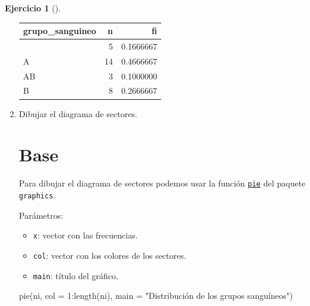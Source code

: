 \documentclass[
  spanish,
  a4paper,
]{scrreport}
\newenvironment{Shaded}{\begin{snugshade}}{\end{snugshade}}
\newcommand{\AttributeTok}[1]{\textcolor[rgb]{0.40,0.45,0.13}{#1}}
\newcommand{\DecValTok}[1]{\textcolor[rgb]{0.68,0.00,0.00}{#1}}
\newcommand{\FunctionTok}[1]{\textcolor[rgb]{0.28,0.35,0.67}{#1}}
\newcommand{\NormalTok}[1]{\textcolor[rgb]{0.00,0.23,0.31}{#1}}
\newcommand{\SpecialCharTok}[1]{\textcolor[rgb]{0.37,0.37,0.37}{#1}}
\newcommand{\StringTok}[1]{\textcolor[rgb]{0.13,0.47,0.30}{#1}}
\providecommand{\tightlist}{%
  \setlength{\itemsep}{0pt}\setlength{\parskip}{0pt}}
\theoremstyle{definition}
\newtheorem{exercise}{Ejercicio}[chapter]
\theoremstyle{remark}
\begin{document}
\begin{exercise}[]
\begin{enumerate}
\begin{tcolorbox}
  \begin{longtable}[]{@{}lrr@{}}
  \toprule\noalign{}
  grupo\_sanguineo & n & fi \\
  \midrule\noalign{}
  \endhead
  \bottomrule\noalign{}
  \endlastfoot
  0 & 5 & 0.1666667 \\
  A & 14 & 0.4666667 \\
  AB & 3 & 0.1000000 \\
  B & 8 & 0.2666667 \\
  \end{longtable}

  \end{tcolorbox}
\item
  Dibujar el diagrama de sectores.

  \begin{tcolorbox}[enhanced jigsaw, titlerule=0mm, arc=.35mm, rightrule=.15mm, opacitybacktitle=0.6, leftrule=.75mm, colframe=quarto-callout-tip-color-frame, toptitle=1mm, breakable, colbacktitle=quarto-callout-tip-color!10!white, bottomrule=.15mm, colback=white, left=2mm, bottomtitle=1mm, opacityback=0, title=\textcolor{quarto-callout-tip-color}{\faLightbulb}\hspace{0.5em}{Solución}, toprule=.15mm, coltitle=black]

  \section{Base}

  Para dibujar el diagrama de sectores podemos usar la función
  \href{https://www.rdocumentation.org/packages/graphics/versions/3.6.2/topics/pie}{\texttt{pie}}
  del paquete \texttt{graphics}.

  Parámetros:

  \begin{itemize}
  \tightlist
  \item
    \texttt{x}: vector con las frecuencias.
  \item
    \texttt{col}: vector con los colores de los sectores.
  \item
    \texttt{main}: título del gráfico.
  \end{itemize}

\begin{Shaded}
\begin{Highlighting}[]
\FunctionTok{pie}\NormalTok{(ni, }\AttributeTok{col =} \DecValTok{1}\SpecialCharTok{:}\FunctionTok{length}\NormalTok{(ni), }\AttributeTok{main =} \StringTok{"Distribución de los grupos sanguíneos"}\NormalTok{)}
\end{Highlighting}
\end{Shaded}


\end{tcolorbox}
\end{enumerate}
\end{exercise}
\end{document}
